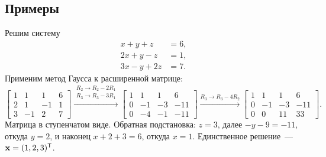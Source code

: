 \subsection*{Примеры}

\begin{example}
\label{ex:gauss-unique}
Решим систему
\[
  \begin{aligned}
    x + y + z &= 6, \\
    2x + y - z &= 1, \\
    3x - y + 2z &= 7.
  \end{aligned}
\]
Применим метод Гаусса к расширенной матрице:
\[
  \left[\begin{array}{rrr|r}
    1 &  1 &  1 & 6 \\
    2 &  1 & -1 & 1 \\
    3 & -1 &  2 & 7
  \end{array}\right]
  \xrightarrow{\substack{R_2 \to R_2 - 2R_1 \\ R_3 \to R_3 - 3R_1}}
  \left[\begin{array}{rrr|r}
    1 &  1 &  1 &   6 \\
    0 & -1 & -3 & -11 \\
    0 & -4 & -1 & -11
  \end{array}\right]
  \xrightarrow{R_3 \to R_3 - 4R_2}
  \left[\begin{array}{rrr|r}
    1 &  1 &  1 &   6 \\
    0 & -1 & -3 & -11 \\
    0 &  0 & 11 &  33
  \end{array}\right].
\]
Матрица в ступенчатом виде. Обратная подстановка: $z = 3$, далее
$-y - 9 = -11$, откуда $y = 2$, и наконец $x + 2 + 3 = 6$, откуда
$x = 1$. Единственное решение~--- $\mathbf{x} = (1, 2, 3)^{\mathsf{T}}$.
\end{example}

